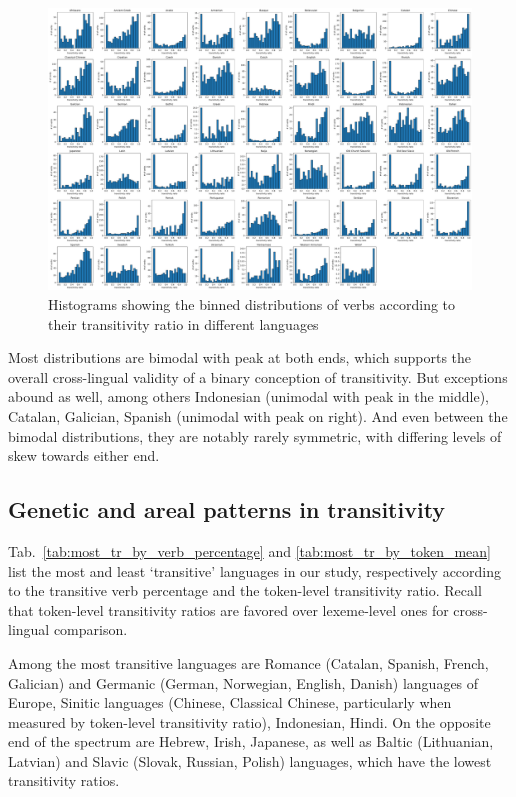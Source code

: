 \begin{figure}
  \centering
  \includegraphics[width=\textwidth]{figures/verb_dist_by_transitivity.pdf}
  \caption{Histograms showing the binned distributions of verbs according to their transitivity ratio in different languages}
  \label{fig:verb_dist_transitivity}
\end{figure}

Most distributions are bimodal with peak at both ends, which supports the overall cross-lingual validity of a binary conception of transitivity. But exceptions abound as well, among others Indonesian (unimodal with peak in the middle), Catalan, Galician, Spanish (unimodal with peak on right). And even between the bimodal distributions, they are notably rarely symmetric, with differing levels of skew towards either end. 

\subsection{Genetic and areal patterns in transitivity}



Tab.~\ref{tab:most_tr_by_verb_percentage} and \ref{tab:most_tr_by_token_mean} list the most and least `transitive' languages in our study, respectively according to the transitive verb percentage and the token-level transitivity ratio. Recall that token-level transitivity ratios are favored over lexeme-level ones for cross-lingual comparison.

Among the most transitive languages are Romance (Catalan, Spanish, French, Galician) and Germanic (German, Norwegian, English, Danish) languages of Europe, Sinitic languages (Chinese, Classical Chinese, particularly when measured by token-level transitivity ratio), Indonesian, Hindi. On the opposite end of the spectrum are Hebrew, Irish, Japanese, as well as Baltic (Lithuanian, Latvian) and Slavic (Slovak, Russian, Polish) languages, which have the lowest transitivity ratios.

